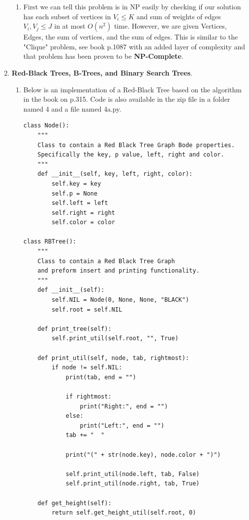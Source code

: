 \documentclass{article}
\begin{document}
\begin{enumerate}
\begin{enumerate}
      \item First we can tell this problem is in NP easily by checking if our solution has each subset of vertices in $V_i \leq K$ and sum of weights of edges $V_i, V_j \leq J$ in at most $O(n^2)$ time. However, we are given Vertices, Edges, the sum of vertices, and the sum of edges.
      This is similar to the "Clique" problem, see book p.1087 with an added layer of complexity and that problem has been proven to be \textbf{NP-Complete}.      
    \end{enumerate}

    \item \textbf{Red-Black Trees, B-Trees, and Binary Search Trees}.
    
    \begin{enumerate}
      \item Below is an implementation of a Red-Black Tree based on the algorithm in the book on p.315. Code is also available in the zip file in a folder named 4 and a file named 4a.py.
      
      \begin{lstlisting}
class Node():
    """
    Class to contain a Red Black Tree Graph Bode properties.
    Specifically the key, p value, left, right and color. 
    """
    def __init__(self, key, left, right, color):
        self.key = key
        self.p = None
        self.left = left
        self.right = right
        self.color = color

class RBTree():
    """
    Class to contain a Red Black Tree Graph
    and preform insert and printing functionality.
    """
    def __init__(self):
        self.NIL = Node(0, None, None, "BLACK")
        self.root = self.NIL
        
    def print_tree(self):
        self.print_util(self.root, "", True)

    def print_util(self, node, tab, rightmost):
        if node != self.NIL:
            print(tab, end = "")            
            
            if rightmost:
                print("Right:", end = "")
            else:
                print("Left:", end = "")
            tab += "  "
                
            print("(" + str(node.key), node.color + ")")
            
            self.print_util(node.left, tab, False)
            self.print_util(node.right, tab, True)
    
    def get_height(self):
        return self.get_height_util(self.root, 0)
    

\end{lstlisting}
\end{enumerate}
\end{enumerate}
\end{document}
